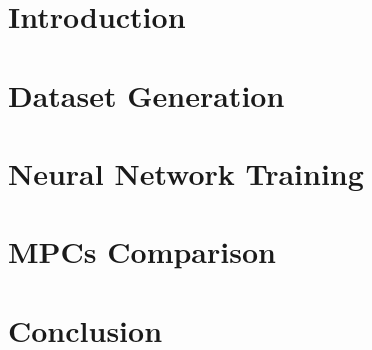 \documentclass[12pt,a4paper,oneside]{book}
\begin{document}
\frontmatter


\mainmatter

\chapter{Introduction} %


\chapter{Dataset Generation} %
\renewcommand{\thefigure}{\thechapter.\arabic{figure}} %
\renewcommand{\thetable}{\thechapter.\arabic{table}} %
\renewcommand{\theequation}{\thechapter.\arabic{equation}} %
\label{cap1}

\chapter{Neural Network Training} %


\chapter{MPCs Comparison} %


\chapter{Conclusion} %

\end{document}
